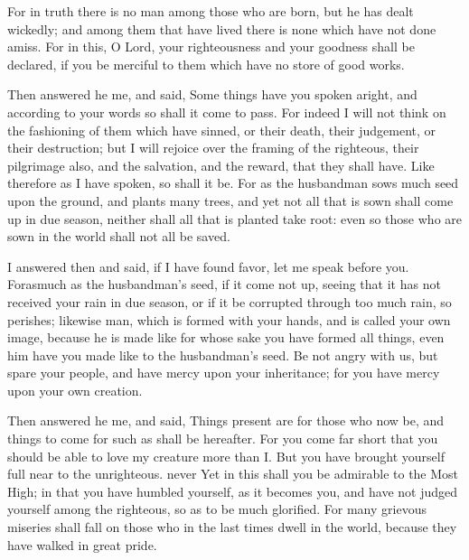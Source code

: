 {For in truth there is no man among those who are born, but he has dealt wickedly; and among them
 that have lived there is none which have not done amiss.
For in this, O Lord, your righteousness and your goodness shall be declared, if you be merciful to them which have no store of good works.
\par }{\PP {}Then answered he me, and said, Some things have you spoken aright, and according to your words so shall it come to pass.
For indeed I will not think on the fashioning of them which have sinned, or their death, their judgement, or their destruction;
but I will rejoice over the framing of the righteous, their pilgrimage also, and the salvation, and the reward, that they shall have.
Like therefore as I have spoken, so shall it be.
For as the husbandman sows much seed upon the ground, and plants many trees, and yet not all that is sown shall
 come up in due season, neither shall all that is planted take root: even so those who are sown in the world shall not all be saved.
\par }{\PP {}I answered then and said, if I have found favor, let me speak before you.
Forasmuch as the husbandman’s seed, if it come not up, seeing that it has not received your rain in due season, or if it be corrupted through too much rain,
 so perishes;
likewise man, which is formed with your hands, and is called your own image, because he is made like
{} for whose sake you have formed all things, even him have you made like to the husbandman’s seed.
Be not angry with us, but spare your people, and have mercy upon your inheritance; for you have mercy upon your own creation.
\par }{\PP {}Then answered he me, and said, Things present are for those who now be, and things to come for such as shall be hereafter.
For you come far short that you should be able to love my creature more than I. But you have brought yourself full near to the unrighteous.
{} never
{}
Yet in this shall you be admirable to the Most High;
in that you have humbled yourself, as it becomes you, and have not judged yourself
{} among the righteous, so as to be much glorified.
For many grievous miseries shall fall on those who in the last times dwell in the world, because they have walked in great pride.
}
